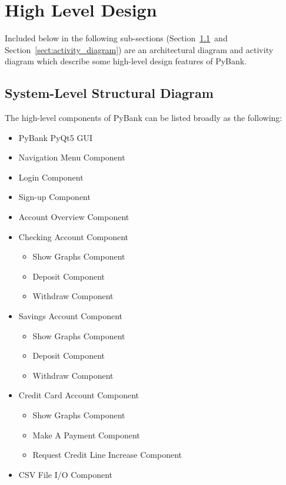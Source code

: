 \section{High Level Design}
\label{sect:high_level_design}

Included below in the following sub-sections (Section~\ref{sect:architectural_diagram}~and Section~\ref{sect:activity_diagram}) are an architectural diagram and activity diagram which describe some high-level design features of PyBank.

\subsection{System-Level Structural Diagram}
\label{sect:architectural_diagram}

The high-level components of PyBank can be listed broadly as the following:
\begin{itemize}
    \item {PyBank PyQt5 GUI}
    \item {Navigation Menu Component}
    \item {Login Component}
    \item {Sign-up Component}
    \item {Account Overview Component}
    \item {Checking Account Component}
        \begin{itemize}
            \item {Show Graphs Component}
            \item {Deposit Component}
            \item {Withdraw Component}
        \end{itemize}
    \item {Savings Account Component}
        \begin{itemize}
            \item {Show Graphs Component}
            \item {Deposit Component}
            \item {Withdraw Component}
        \end{itemize}
    \item {Credit Card Account Component}
        \begin{itemize}
            \item {Show Graphs Component}
            \item {Make A Payment Component}
            \item {Request Credit Line Increase Component}
        \end{itemize}
    \item {CSV File I/O Component}
\end{itemize}

